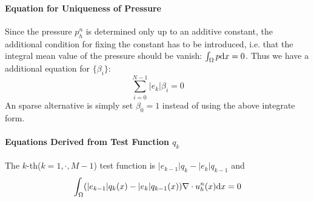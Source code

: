 \paragraph{Equation for Uniqueness of Pressure} Since the pressure $p_h^n$ is determined only up to an additive constant, 
the additional condition for fixing the constant has to be introduced, 
i.e. that the integral mean value of the pressure should be vanish: $\int_\Omega p\mathrm{d} x=0$. Thus we have a additional equation for $\{\beta_i\}$:
\[
  \sum_{i=0}^{N-1}|e_k|\beta_i=0
  \]
An sparse alternative is simply set $\beta_0=1$ instead of using the above integrate form.

\paragraph{Equations Derived from Test Function $q_k$} The $k$-th($k=1,\cdot,M-1$) test function is $|e_{k-1}|q_k-|e_k|q_{k-1}$ and 
\begin{equation}\label{eq:equation-testq}
  \int_{\Omega}(|e_{k-1}|q_k(x)-|e_k|q_{k-1}(x))\nabla\cdot u_h^n(x)\mathrm{d} x=0
\end{equation}

